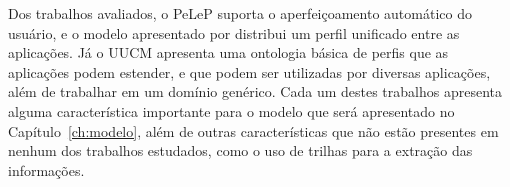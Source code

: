 Dos trabalhos avaliados, o PeLeP suporta o aperfeiçoamento automático do usuário, e o modelo apresentado por  distribui um perfil unificado entre as aplicações. Já o UUCM apresenta uma ontologia básica de perfis que as aplicações podem estender, e que podem ser utilizadas por diversas aplicações, além de trabalhar em um domínio genérico. Cada um destes trabalhos apresenta alguma característica importante para o modelo que será apresentado no Capítulo~\ref{ch:modelo}, além de outras características que não estão presentes em nenhum dos trabalhos estudados, como o uso de trilhas para a extração das informações.
